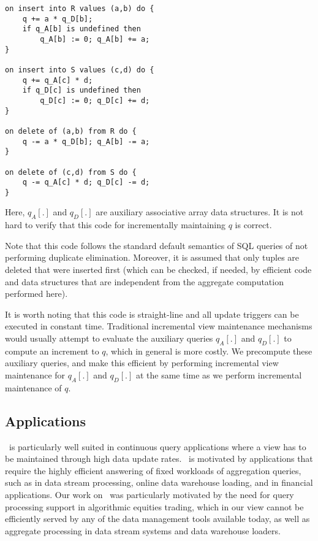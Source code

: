 \begin{example}
\begin{verbatim}
on insert into R values (a,b) do {
    q += a * q_D[b];
    if q_A[b] is undefined then
        q_A[b] := 0; q_A[b] += a;
}

on insert into S values (c,d) do {
    q += q_A[c] * d;
    if q_D[c] is undefined then
        q_D[c] := 0; q_D[c] += d;
}

on delete of (a,b) from R do {
    q -= a * q_D[b]; q_A[b] -= a;
}

on delete of (c,d) from S do {
    q -= q_A[c] * d; q_D[c] -= d;
}

\end{verbatim}
Here, $q_A[.]$ and $q_D[.]$ are auxiliary associative array data
structures.  It is not hard to verify that this code for incrementally
maintaining $q$ is correct.

Note that this code follows the standard default semantics of SQL queries of not
performing duplicate elimination. Moreover, it is assumed that only tuples are
deleted that were inserted first (which can be checked, if needed, by efficient
code and data structures that are independent from the aggregate computation
performed here).

It is worth noting that this code is straight-line and all update triggers can
be executed in constant time. Traditional incremental view maintenance
mechanisms would usually attempt to evaluate the auxiliary queries $q_A[.]$ and
$q_D[.]$ to compute an increment to $q$, which in general is more costly.  We
precompute these auxiliary queries, and make this efficient by performing
incremental view maintenance for $q_A[.]$ and $q_D[.]$ at the same time as we
perform incremental maintenance of $q$.
\end{example}



\subsection{Applications}


\compiler\ is particularly well suited in continuous query applications where a
view has to be maintained through high data update rates. \compiler\ is
motivated by applications that require the highly efficient answering of fixed
workloads of aggregation queries, such as in data stream processing, online data
warehouse loading, and in financial applications. Our work on \compiler\ was
particularly motivated by the need for query processing support in algorithmic
equities trading, which in our view cannot be efficiently served by any of the
data management tools available today, as well as aggregate processing in data
stream systems and data warehouse loaders.


